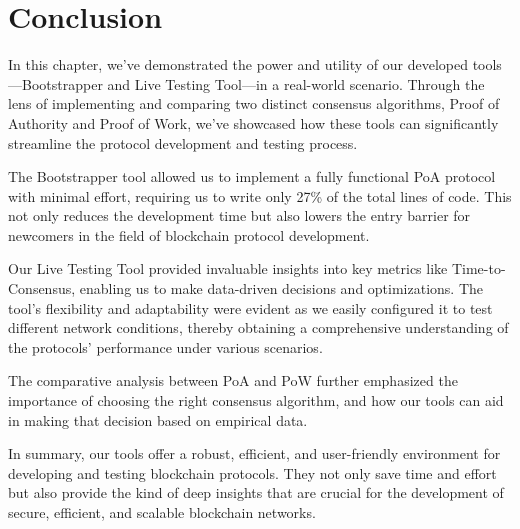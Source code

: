 \section{Conclusion}

In this chapter, we've demonstrated the power and utility of our developed tools—Bootstrapper and Live Testing Tool—in a real-world scenario. Through the lens of implementing and comparing two distinct consensus algorithms, Proof of Authority and Proof of Work, we've showcased how these tools can significantly streamline the protocol development and testing process.

The Bootstrapper tool allowed us to implement a fully functional PoA protocol with minimal effort, requiring us to write only 27\% of the total lines of code. This not only reduces the development time but also lowers the entry barrier for newcomers in the field of blockchain protocol development.

Our Live Testing Tool provided invaluable insights into key metrics like Time-to-Consensus, enabling us to make data-driven decisions and optimizations. The tool's flexibility and adaptability were evident as we easily configured it to test different network conditions, thereby obtaining a comprehensive understanding of the protocols' performance under various scenarios.

The comparative analysis between PoA and PoW further emphasized the importance of choosing the right consensus algorithm, and how our tools can aid in making that decision based on empirical data.

In summary, our tools offer a robust, efficient, and user-friendly environment for developing and testing blockchain protocols. They not only save time and effort but also provide the kind of deep insights that are crucial for the development of secure, efficient, and scalable blockchain networks.

